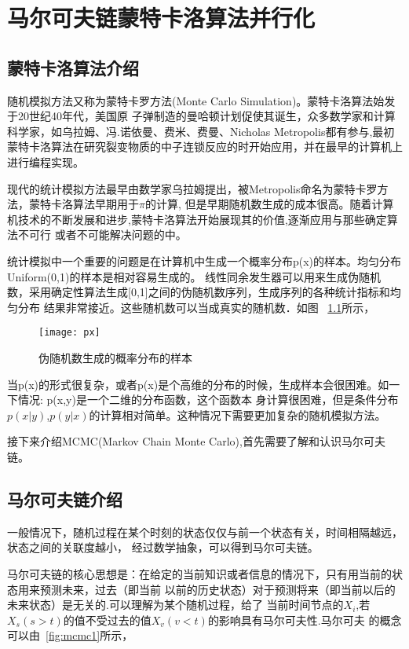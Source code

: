 
\chapter[马尔可夫链蒙特卡洛算法并行化]{马尔可夫链蒙特卡洛算法并行化}
\section{蒙特卡洛算法介绍}
    随机模拟方法又称为蒙特卡罗方法(Monte Carlo Simulation)。蒙特卡洛算法始发于20世纪40年代，美国原
子弹制造的曼哈顿计划促使其诞生，众多数学家和计算科学家，如乌拉姆、冯.诺依曼、费米、费曼、Nicholas Metropolis都有参与,最初
蒙特卡洛算法在研究裂变物质的中子连锁反应的时开始应用，并在最早的计算机上进行编程实现。

    现代的统计模拟方法最早由数学家乌拉姆提出，被Metropolis命名为蒙特卡罗方法，蒙特卡洛算法早期用于$\pi$的计算,
但是早期随机数生成的成本很高。随着计算机技术的不断发展和进步,蒙特卡洛算法开始展现其的价值,逐渐应用与那些确定算法不可行
或者不可能解决问题的中。

    统计模拟中一个重要的问题是在计算机中生成一个概率分布p(x)的样本。均匀分布Uniform(0,1)的样本是相对容易生成的。 
线性同余发生器可以用来生成伪随机数，采用确定性算法生成[0,1]之间的伪随机数序列，生成序列的各种统计指标和均匀分布
结果非常接近。这些随机数可以当成真实的随机数．如图 ~\ref{fig:px}所示，

    \begin{figure}[htbp]
    \centering
    \texttt{[image: px]}
    \caption{伪随机数生成的概率分布的样本}\label{fig:px}
    \vspace{\baselineskip}
    \end{figure}

    当p(x)的形式很复杂，或者p(x)是个高维的分布的时候，生成样本会很困难。如一下情况: p(x,y)是一个二维的分布函数，这个函数本
身计算很困难，但是条件分布 $p(x|y)$,$p(y|x)$的计算相对简单。这种情况下需要更加复杂的随机模拟方法。

接下来介绍MCMC(Markov Chain Monte Carlo),首先需要了解和认识马尔可夫链。


\section{马尔可夫链介绍}
  一般情况下，随机过程在某个时刻的状态仅仅与前一个状态有关，时间相隔越远，状态之间的关联度越小，
经过数学抽象，可以得到马尔可夫链。

    马尔可夫链的核心思想是：在给定的当前知识或者信息的情况下，只有用当前的状态用来预测未来，过去（即当前
以前的历史状态）对于预测将来（即当前以后的未来状态）是无关的.可以理解为某个随机过程，给了
当前时间节点的$X_i$,若$X_s(s>t)$的值不受过去的值$X_v(v<t)$的影响具有马尔可夫性.马尔可夫
的概念可以由~\ref{fig:mcmc1}所示，

